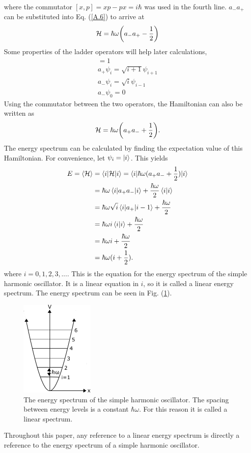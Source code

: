where the commutator $[x,p]=xp-px=i\hbar$ was used in the fourth line. $a_-a_+$ can be substituted into Eq. (\ref{A.6}) to arrive at 
\begin{equation}
    \mathcal{H}=\hbar\omega\qty(a_-a_+-\frac{1}{2})
\end{equation}
Some properties of the ladder operators will help later calculations,
\begin{gather}
    [a_-,a_+]=1\\
    a_+\psi_i=\sqrt{i+1} \psi_{i+1}\\
    a_-\psi_i=\sqrt{i}\psi_{i-1}\\
    a_-\psi_0=0
\end{gather}
Using the commutator between the two operators, the Hamiltonian can also be written as 
\begin{equation}
    \mathcal{H}=\hbar\omega\qty(a_+a_-+\frac{1}{2}).
\end{equation}
The energy spectrum can be calculated by finding the expectation value of this Hamiltonian. For convenience, let $\psi_i=\ket{i}$. This yields 
\begin{align}
    E=\left<{\mathcal{H}}\right>&=\braket{i|\mathcal{H}|i}=\braket{i|\hbar\omega (a_+a_-+\frac{1}{2})|i}\nonumber\\
    &=\hbar\omega \braket{i|a_+a_-|i}+\frac{\hbar\omega}{2}\braket{i|i}\nonumber\\
    &=\hbar\omega \sqrt{i}\braket{i|a_+|i-1}+\frac{\hbar\omega}{2}\nonumber\\
    &=\hbar\omega i \braket{i|i}+\frac{\hbar\omega}{2}\nonumber\\
    &=\hbar\omega i +\frac{\hbar\omega}{2}\nonumber\\
    &=\hbar\omega(i+\frac{1}{2}).
\end{align}
where $i=0,1,2,3,...$. This is the equation for the energy spectrum of the simple harmonic oscillator. It is a linear equation in $i$, so it is called a linear energy spectrum. The energy spectrum can be seen in Fig. (\ref{fig:Simple Harmonic Oscillator Spectrum}).
\begin{figure}[H]
    \centering
    \includegraphics[scale=1.0]{figures/pdf/SHOspectrum.png}
    \caption{The energy spectrum of the simple harmonic oscillator. The spacing between energy levels is a constant $\hbar\omega$. For this reason it is called a linear spectrum.}
    \label{fig:Simple Harmonic Oscillator Spectrum}
\end{figure}Throughout this paper, any reference to a linear energy spectrum is directly a reference to the energy spectrum of a simple harmonic oscillator.

